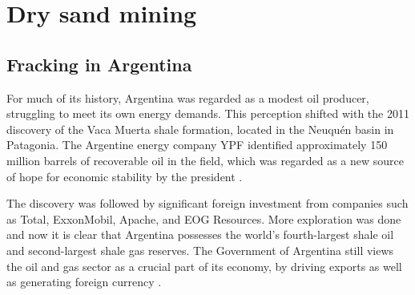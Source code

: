 \chapter{Dry sand mining}



\section{Fracking in Argentina}
For much of its history, Argentina was regarded as a modest oil producer, struggling to meet its own energy demands. This perception shifted with the 2011 discovery of the Vaca Muerta shale formation, located in the Neuquén basin in Patagonia. The Argentine energy company YPF identified approximately 150 million barrels of recoverable oil in the field, which was regarded as a new source of hope for economic stability by the president \autocite{kraussArgentinaHopesBig2011}.

The discovery was followed by significant foreign investment from companies such as Total, ExxonMobil, Apache, and EOG Resources. More exploration was done and now it is clear that Argentina possesses the world’s fourth-largest shale oil and second-largest shale gas reserves. The Government of Argentina still views the oil and gas sector as a crucial part of its economy, by driving exports as well as generating foreign currency \autocite{int}.

